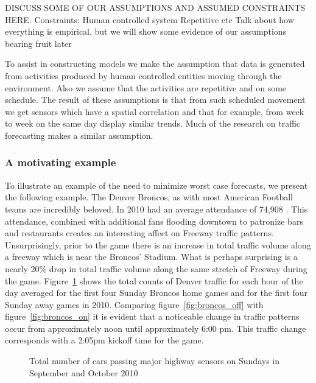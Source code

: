 DISCUSS SOME OF OUR ASSUMPTIONS AND ASSUMED CONSTRAINTS HERE. 
Constraints:
Human controlled system
Repetitive
etc
Talk about how everything is empirical, but we will show some evidence of our assumptions bearing fruit later

To assist in constructing models we make the assumption that data is generated from activities produced by human controlled entities moving through the environment.  Also we assume that the activities are repetitive and on some schedule.  The result of these assumptions is that from such scheduled movement we get sensors which have a spatial correlation and that for example, from week to week on the same day display similar trends.   Much of the research on traffic forecasting makes a similar assumption.  




\subsubsection{A motivating example}

To illustrate an example of the need to minimize worst case forecasts, we present the following example.  The Denver Broncos, as with most American Football teams are incredibly beloved.  In 2010 had an average attendance of 74,908 \cite{ESPN2013}.  This attendance, combined with additional fans flooding downtown to patronize bars and restaurants creates an interesting affect on Freeway traffic patterns.  Unsurprisingly, prior to the game there is an increase in total traffic volume along a freeway which is near the Broncos' Stadium.  What is perhaps surprising is a nearly 20\% drop in total traffic volume along the same stretch of Freeway during the game.  Figure~\ref{fig:broncos} shows the total counts of Denver traffic for each hour of the day averaged for the first four Sunday Broncos home games and for the first four Sunday away games in 2010.  Comparing figure~\ref{fig:broncos_off} with figure~\ref{fig:broncos_on} it is evident that a noticeable change in traffic patterns occur from approximately noon until approximately 6:00 pm.  This traffic change corresponds with a 2:05pm kickoff time for the game.

\begin{figure}[!ht]
	\begin{center}
	\end{center}
	\caption{Total number of cars passing major highway sensors on Sundays in September and October 2010}
	\label{fig:broncos}
\end{figure}

